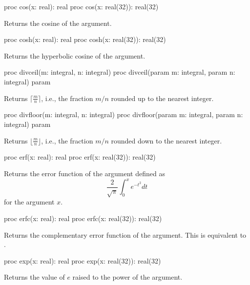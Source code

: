 \begin{protohead}
proc cos(x: real): real
proc cos(x: real(32)): real(32)
\end{protohead}
\begin{protobody}
Returns the cosine of the argument.
\end{protobody}

\begin{protohead}
proc cosh(x: real): real
proc cosh(x: real(32)): real(32)
\end{protohead}
\begin{protobody}
Returns the hyperbolic cosine of the argument.
\end{protobody}

\begin{protohead}
proc divceil(m: integral, n: integral)
proc divceil(param m: integral, param n: integral) param
\end{protohead}
\begin{protobody}
Returns
$\lceil\frac{m}{n}\rceil$,
i.e., the fraction $m/n$ rounded up to the nearest integer.
\end{protobody}

\begin{protohead}
proc divfloor(m: integral, n: integral)
proc divfloor(param m: integral, param n: integral) param
\end{protohead}
\begin{protobody}
Returns
$\lfloor\frac{m}{n}\rfloor$,
i.e., the fraction $m/n$ rounded down to the nearest integer.
\end{protobody}

\begin{protohead}
proc erf(x: real): real
proc erf(x: real(32)): real(32)
\end{protohead}
\begin{protobody}
Returns the error function of the argument defined as
$$\frac{2}{\sqrt{\pi}}\int^x_0e^{-t^2}dt$$
for the argument $x$.
\end{protobody}

\begin{protohead}
proc erfc(x: real): real
proc erfc(x: real(32)): real(32)
\end{protohead}
\begin{protobody}
Returns the complementary error function of the argument.  This is
equivalent to .
\end{protobody}

\begin{protohead}
proc exp(x: real): real
proc exp(x: real(32)): real(32)
\end{protohead}
\begin{protobody}
Returns the value of $e$ raised to the power of the argument.
\end{protobody}

